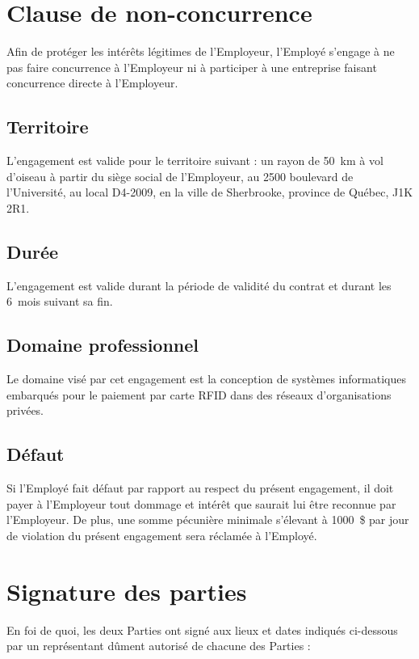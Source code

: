 \documentclass{article}
\begin{document}
    	\section{Clause de non-concurrence}
    	Afin de protéger les intérêts légitimes de l'Employeur, l'Employé s'engage  à ne pas faire concurrence à l'Employeur ni à participer à une entreprise faisant concurrence directe à l'Employeur.
    	
    		\subsection{Territoire}
    		L'engagement est valide pour le territoire suivant : un rayon de \SI{50}{km} à vol d'oiseau à partir du siège social de l'Employeur, au 2500 boulevard de l'Université, au local D4-2009, en la ville de Sherbrooke, province de Québec, J1K 2R1.
    		
    		\subsection{Durée}
    		L'engagement est valide durant la période de validité du contrat et durant les 6~mois suivant sa fin.
    		
    		\subsection{Domaine professionnel}
    		Le domaine visé par cet engagement est la conception de systèmes informatiques embarqués pour le paiement par carte RFID dans des réseaux d'organisations privées.
    		
    		\subsection{Défaut} Si l'Employé fait défaut par rapport au respect du présent engagement, il doit payer à l'Employeur tout dommage et intérêt que saurait lui être reconnue par l'Employeur. De plus, une somme pécunière minimale s'élevant à \SI{1000}{\$} par jour de violation du présent engagement sera réclamée à l'Employé.
    	
    \pagebreak
   	\section{Signature des parties}
   	En foi de quoi, les deux Parties ont signé aux lieux et dates indiqués ci-dessous par un représentant dûment autorisé de chacune des Parties : \\
    	
\end{document}
